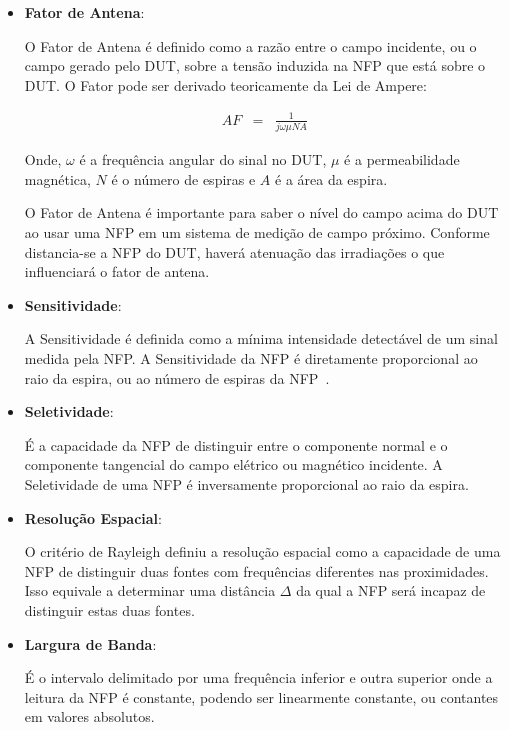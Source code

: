 \begin{itemize}
 \item \textbf{Fator de Antena}:
 
 O Fator de Antena é definido como a razão entre o campo incidente, ou o campo gerado pelo DUT, sobre a tensão induzida na NFP que está sobre o DUT. O Fator pode ser derivado teoricamente da Lei de Ampere:
 
 \begin{eqnarray}
 AF &=& \frac{1}{j\omega \mu N A} \label{FatorAntena}
 \end{eqnarray}
 
 Onde, $\omega$ é a frequência angular do sinal no DUT, $\mu$ é a permeabilidade magnética, $N$ é o número de espiras e $A$ é a área da espira.

 O Fator de Antena é importante para saber o nível do campo acima do DUT ao usar uma NFP em um sistema de medição de campo próximo. Conforme distancia-se a NFP do DUT, haverá atenuação das irradiações o que influenciará o fator de antena.
 
 \item \textbf{Sensitividade}:
 
 A Sensitividade é definida como a mínima intensidade detectável de um sinal medida pela NFP. A Sensitividade da NFP é diretamente proporcional ao raio da espira, ou ao número de espiras da NFP~\cite[p.~36]{sivaraman2017}.
 
 \item \textbf{Seletividade}:
 
 É a capacidade da NFP de distinguir entre o componente normal e o componente tangencial do campo elétrico ou magnético incidente. A Seletividade de uma NFP é inversamente proporcional ao raio da espira.
 
 \item \textbf{Resolução Espacial}:
 
 O critério de Rayleigh definiu a resolução espacial como a capacidade de uma NFP de distinguir duas fontes com frequências diferentes nas proximidades. Isso equivale a determinar uma distância $\Delta$ da qual a NFP será incapaz de distinguir estas duas fontes.
 
 \item \textbf{Largura de Banda}:
 
 É o intervalo delimitado por uma frequência inferior e outra superior onde a leitura da NFP é constante, podendo ser linearmente constante, ou contantes em valores absolutos.
 
\end{itemize}

